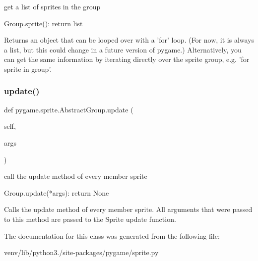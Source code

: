 \begin{DoxyVerb}get a list of sprites in the group

Group.sprite(): return list

Returns an object that can be looped over with a 'for' loop. (For now,
it is always a list, but this could change in a future version of
pygame.) Alternatively, you can get the same information by iterating
directly over the sprite group, e.g. 'for sprite in group'.\end{DoxyVerb}
 \mbox{\label{classpygame_1_1sprite_1_1_abstract_group_a945ba48cfeeaef0d9b56e07fbe9f9b98}} 
\subsubsection{\texorpdfstring{update()}{update()}}
{\footnotesize\ttfamily def pygame.\+sprite.\+Abstract\+Group.\+update (\begin{DoxyParamCaption}\item[{}]{self,  }\item[{}]{args }\end{DoxyParamCaption})}

\begin{DoxyVerb}call the update method of every member sprite

Group.update(*args): return None

Calls the update method of every member sprite. All arguments that
were passed to this method are passed to the Sprite update function.\end{DoxyVerb}
 

The documentation for this class was generated from the following file\+:\begin{DoxyCompactItemize}
\item 
venv/lib/python3./site-\/packages/pygame/sprite.\+py\end{DoxyCompactItemize}
